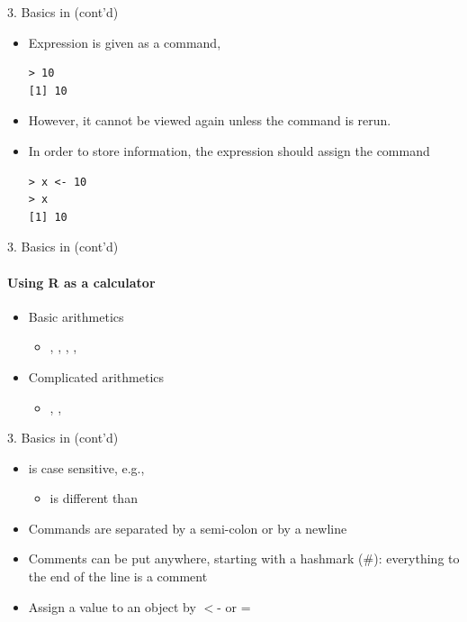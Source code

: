 \documentclass[14pt, aspectratio=169, sectionpage=simple, xclolor=table]{beamer}
\begin{document}
\begin{frame}[fragile]{3. Basics in \R (cont'd)}
\begin{itemize}
\item Expression is given as a command,
{\small
\begin{verbatim}
> 10
[1] 10
\end{verbatim}
}
\item However, it cannot be viewed again unless the command is rerun.
\item In order to store information, the expression should assign the command
{\small
\begin{verbatim}
> x <- 10
> x
[1] 10
\end{verbatim}
}
\end{itemize}
\end{frame}
\begin{frame}{3. Basics in \R (cont'd)}
\framesubtitle{Using R as a calculator}
\begin{itemize}
	\item Basic arithmetics
	\begin{itemize}
		\item \code{+}, \code{-}, \code{*}, \code{/}, \code{\^}
		\vspace{1ex}
		\vspace{1ex}
	\end{itemize}
	\item Complicated arithmetics
	\begin{itemize}
		\item \code{\%*\%}, , \code{\%/\%}
	\end{itemize}
\end{itemize}
\end{frame}
\begin{frame}[fragile]{3. Basics in \R (cont'd)}
\begin{itemize}
\item \R is case sensitive, e.g.,
\begin{itemize}
\item {} is different than 
\nl
\end{itemize}
\item Commands are separated by a semi-colon or by a newline
\nl
\item Comments can be put anywhere, starting with a hashmark (\#): everything to the end of the line is a comment
\nl
\item Assign a value to an object by $<$- or =
\end{itemize}
\end{frame}
\end{document}
